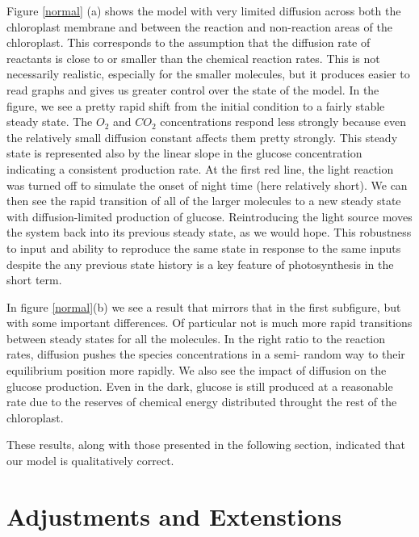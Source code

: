 \documentclass[12pt,reqno]{amsart}
\begin{document}
    Figure \ref{normal} (a) shows the model with very limited diffusion across both the
    chloroplast membrane and between the reaction and non-reaction areas of the 
    chloroplast. This corresponds to the assumption that the diffusion rate
    of reactants is close to or smaller than the chemical reaction rates.
    This is not necessarily realistic, especially for the smaller molecules,
    but it produces easier to read graphs and gives us greater control over
    the state of the model.  In the figure, we see a pretty rapid shift from 
    the initial condition to a fairly stable steady state.  The $O_2$ and $CO_2$
    concentrations respond less strongly because even the relatively small
    diffusion constant affects them pretty strongly.  This steady state 
    is represented also by the linear slope in the glucose concentration
    indicating a consistent production rate.  At the first red line, the light
    reaction was turned off to simulate the onset of night time (here relatively short).  
    We can then see the rapid transition of all of the larger molecules to 
    a new steady state with diffusion-limited production of glucose.  Reintroducing
    the light source moves the system back into its previous steady state, as we
    would hope. This robustness to input  and ability
    to reproduce the same state in response to the same inputs despite the any previous
    state history is a key feature of photosynthesis in the short term.
    
    In figure \ref{normal}(b) we see a result that mirrors that in the first subfigure,
    but with some important differences.  Of particular not is much more rapid 
    transitions between steady states for all the molecules.  In the right ratio
    to the reaction rates, diffusion pushes the species concentrations in a semi-
    random way to their equilibrium position more rapidly.  We also see the impact
    of diffusion on the glucose production.  Even in the dark, glucose is still
    produced at a reasonable rate due to the reserves of chemical energy distributed
    throught the rest of the chloroplast.  
    
    These results, along with those presented in the following section, indicated 
    that our model is qualitatively correct.	
	
	
	\section*{\large \textbf{Adjustments and Extenstions}}
	
\end{document}
